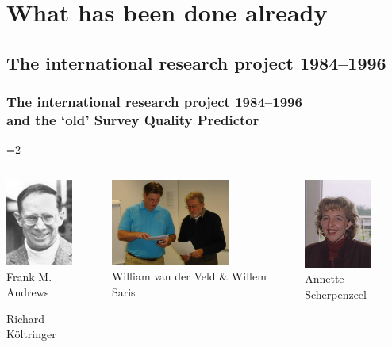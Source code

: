 \documentclass{beamer}
\begin{document}
\section{What has been done already}

\subsection{The international research project 1984--1996}

\begin{frame}
 \frametitle{The international research project 1984--1996\\and the `old' Survey Quality Predictor}
\end{frame}

=2
\begin{frame}
\begin{small}
	\begin{columns}[T]	
		\begin{column}{2.5cm}
			\includegraphics[width=2.2cm]{i/andrews.jpg}\\
			Frank M. Andrews\\	\vspace{.2cm}
			
			\vspace{1cm}
			Richard K\"{o}ltringer			
		
		\end{column}		
		\begin{column}{4cm}
			\includegraphics[width=3.916cm]{i/veldandsaris.jpg}\\
					William	van der Veld \& Willem Saris\\					
			
			
		\end{column}		
		\begin{column}{2.5cm}		
		\includegraphics[width=2.2cm]{i/scherpenzeel.jpg}\\
			Annette Scherpenzeel\\ \vspace{.2cm}
						

\end{column}
\end{columns}
\end{small}
\end{frame}
\end{document}

